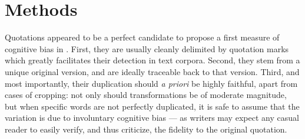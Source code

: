 \section{Methods} %
\label{sec:protocol}

Quotations appeared to be a perfect candidate to propose a first measure of  cognitive bias in .
First, they are usually cleanly delimited by quotation marks which greatly facilitates their detection in text corpora.
Second, they stem from a unique original version, and are ideally traceable back to that version.
Third, and most importantly, their duplication should \emph{a priori} be highly faithful, apart from cases of cropping:
not only should transformations be of moderate magnitude, but when specific words are not perfectly duplicated, it is safe to assume that the variation is due to involuntary cognitive bias --- as writers may expect any casual reader to easily verify, and thus criticize, the fidelity to the original quotation.

